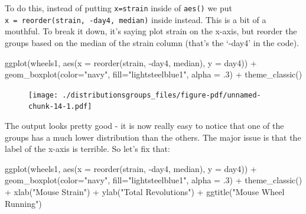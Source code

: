 \documentclass[
  letterpaper,
  DIV=11,
  numbers=noendperiod]{scrreprt}
\newenvironment{Shaded}{\begin{snugshade}}{\end{snugshade}}
\newcommand{\AttributeTok}[1]{\textcolor[rgb]{0.40,0.45,0.13}{#1}}
\newcommand{\DecValTok}[1]{\textcolor[rgb]{0.68,0.00,0.00}{#1}}
\newcommand{\FunctionTok}[1]{\textcolor[rgb]{0.28,0.35,0.67}{#1}}
\newcommand{\NormalTok}[1]{\textcolor[rgb]{0.00,0.23,0.31}{#1}}
\newcommand{\SpecialCharTok}[1]{\textcolor[rgb]{0.37,0.37,0.37}{#1}}
\newcommand{\StringTok}[1]{\textcolor[rgb]{0.13,0.47,0.30}{#1}}
\begin{document}
To do this, instead of putting \texttt{x=strain} inside of
\texttt{aes()} we put \texttt{x\ =\ reorder(strain,\ -day4,\ median)}
inside instead. This is a bit of a mouthful. To break it down, it's
saying plot strain on the x-axis, but reorder the groups based on the
median of the strain column (that's the `-day4' in the code).

\begin{Shaded}
\begin{Highlighting}[]
\FunctionTok{ggplot}\NormalTok{(wheels1, }\FunctionTok{aes}\NormalTok{(}\AttributeTok{x =} \FunctionTok{reorder}\NormalTok{(strain, }\SpecialCharTok{{-}}\NormalTok{day4, median), }\AttributeTok{y =}\NormalTok{ day4)) }\SpecialCharTok{+} 
  \FunctionTok{geom\_boxplot}\NormalTok{(}\AttributeTok{color=}\StringTok{"navy"}\NormalTok{, }\AttributeTok{fill=}\StringTok{"lightsteelblue1"}\NormalTok{, }\AttributeTok{alpha =}\NormalTok{ .}\DecValTok{3}\NormalTok{) }\SpecialCharTok{+}
  \FunctionTok{theme\_classic}\NormalTok{()}
\end{Highlighting}
\end{Shaded}

\begin{figure}[H]

{\centering \texttt{[image: ./distributionsgroups\_files/figure-pdf/unnamed-chunk-14-1.pdf]}

}

\end{figure}

The output looks pretty good - it is now really easy to notice that one
of the groups has a much lower distribution than the others. The major
issue is that the label of the x-axis is terrible. So let's fix that:

\begin{Shaded}
\begin{Highlighting}[]
\FunctionTok{ggplot}\NormalTok{(wheels1, }\FunctionTok{aes}\NormalTok{(}\AttributeTok{x =} \FunctionTok{reorder}\NormalTok{(strain, }\SpecialCharTok{{-}}\NormalTok{day4, median), }\AttributeTok{y =}\NormalTok{ day4)) }\SpecialCharTok{+} 
  \FunctionTok{geom\_boxplot}\NormalTok{(}\AttributeTok{color=}\StringTok{"navy"}\NormalTok{, }\AttributeTok{fill=}\StringTok{"lightsteelblue1"}\NormalTok{, }\AttributeTok{alpha =}\NormalTok{ .}\DecValTok{3}\NormalTok{) }\SpecialCharTok{+}
  \FunctionTok{theme\_classic}\NormalTok{() }\SpecialCharTok{+}
  \FunctionTok{xlab}\NormalTok{(}\StringTok{"Mouse Strain"}\NormalTok{) }\SpecialCharTok{+}
  \FunctionTok{ylab}\NormalTok{(}\StringTok{"Total Revolutions"}\NormalTok{) }\SpecialCharTok{+}
  \FunctionTok{ggtitle}\NormalTok{(}\StringTok{"Mouse Wheel Running"}\NormalTok{)}
\end{Highlighting}
\end{Shaded}
\end{document}
